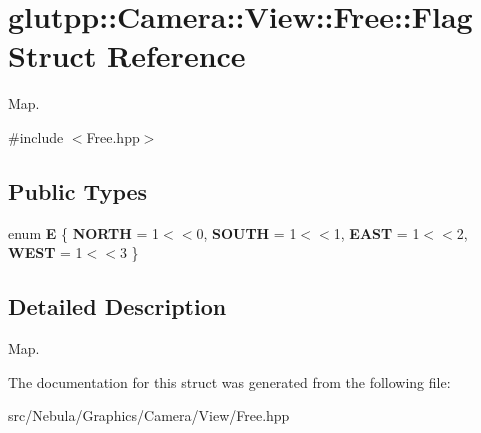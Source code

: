 \hypertarget{structglutpp_1_1Camera_1_1View_1_1Free_1_1Flag}{\section{glutpp\-:\-:\-Camera\-:\-:\-View\-:\-:\-Free\-:\-:\-Flag \-Struct \-Reference}
\label{structglutpp_1_1Camera_1_1View_1_1Free_1_1Flag}
}


\-Map.  




{\ttfamily \#include $<$\-Free.\-hpp$>$}

\subsection*{\-Public \-Types}
\begin{DoxyCompactItemize}
\item 
enum {\bfseries \-E} \{ {\bfseries \-N\-O\-R\-T\-H} =  1$<$$<$0, 
{\bfseries \-S\-O\-U\-T\-H} =  1$<$$<$1, 
{\bfseries \-E\-A\-S\-T} =  1$<$$<$2, 
{\bfseries \-W\-E\-S\-T} =  1$<$$<$3
 \}
\end{DoxyCompactItemize}


\subsection{\-Detailed \-Description}
\-Map. 

\-The documentation for this struct was generated from the following file\-:\begin{DoxyCompactItemize}
\item 
src/\-Nebula/\-Graphics/\-Camera/\-View/\-Free.\-hpp\end{DoxyCompactItemize}
